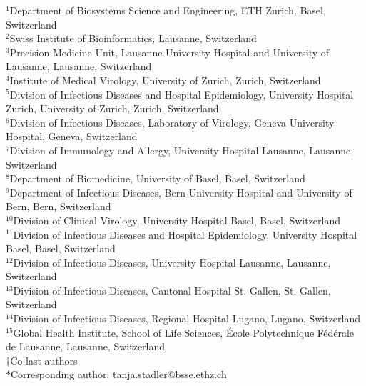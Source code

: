 \documentclass[11pt]{article}
\begin{document}
\noindent
$^{1}$Department of Biosystems Science and Engineering, ETH Zurich, Basel, Switzerland\\
$^{2}$Swiss Institute of Bioinformatics, Lausanne, Switzerland\\ 
$^{3}$Precision Medicine Unit, Lausanne University Hospital and University of Lausanne, Lausanne, Switzerland\\ 
$^{4}$Institute of Medical Virology, University of Zurich, Zurich, Switzerland\\ 
$^{5}$Division of Infectious Diseases and Hospital Epidemiology, University Hospital Zurich, University of Zurich, Zurich, Switzerland\\
$^{6}$Division of Infectious Diseases, Laboratory of Virology, Geneva University Hospital, Geneva, Switzerland\\
$^{7}$Division of Immunology and Allergy, University Hospital Lausanne, Lausanne, Switzerland\\
$^{8}$Department of Biomedicine, University of Basel, Basel, Switzerland\\
$^{9}$Department of Infectious Diseases, Bern University Hospital and University of Bern, Bern, Switzerland\\
$^{10}$Division of Clinical Virology, University Hospital Basel, Basel, Switzerland\\
$^{11}$Division of Infectious Diseases and Hospital Epidemiology, University Hospital Basel, Basel, Switzerland\\
$^{12}$Division of Infectious Diseases, University Hospital Lausanne, Lausanne, Switzerland\\
$^{13}$Division of Infectious Diseases, Cantonal Hospital St. Gallen, St. Gallen, Switzerland\\
$^{14}$Division of Infectious Diseases, Regional Hospital Lugano, Lugano, Switzerland\\
$^{15}$Global Health Institute, School of Life Sciences, École Polytechnique Fédérale de Lausanne, Lausanne, Switzerland\\
$\dagger$Co-last authors\\
$*$Corresponding author: tanja.stadler@bsse.ethz.ch
\end{document}
